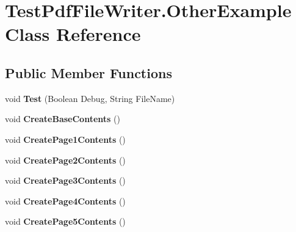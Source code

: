 \hypertarget{class_test_pdf_file_writer_1_1_other_example}{}\section{Test\+Pdf\+File\+Writer.\+Other\+Example Class Reference}
\label{class_test_pdf_file_writer_1_1_other_example}
\subsection*{Public Member Functions}
\begin{DoxyCompactItemize}
\item 
void {\bfseries Test} (Boolean Debug, String File\+Name)\hypertarget{class_test_pdf_file_writer_1_1_other_example_a05d9691e183d8d2abbf63fe55873abaf}{}\label{class_test_pdf_file_writer_1_1_other_example_a05d9691e183d8d2abbf63fe55873abaf}

\item 
void {\bfseries Create\+Base\+Contents} ()\hypertarget{class_test_pdf_file_writer_1_1_other_example_a222171120b6dc9bf6f203375d718e258}{}\label{class_test_pdf_file_writer_1_1_other_example_a222171120b6dc9bf6f203375d718e258}

\item 
void {\bfseries Create\+Page1\+Contents} ()\hypertarget{class_test_pdf_file_writer_1_1_other_example_affce4d5ab7154723a18a561719cad9bc}{}\label{class_test_pdf_file_writer_1_1_other_example_affce4d5ab7154723a18a561719cad9bc}

\item 
void {\bfseries Create\+Page2\+Contents} ()\hypertarget{class_test_pdf_file_writer_1_1_other_example_aba5ec85f75e69699fd78dbd4e90ec4ba}{}\label{class_test_pdf_file_writer_1_1_other_example_aba5ec85f75e69699fd78dbd4e90ec4ba}

\item 
void {\bfseries Create\+Page3\+Contents} ()\hypertarget{class_test_pdf_file_writer_1_1_other_example_a59afb037cda75823a03fa8dbd4fc8d5e}{}\label{class_test_pdf_file_writer_1_1_other_example_a59afb037cda75823a03fa8dbd4fc8d5e}

\item 
void {\bfseries Create\+Page4\+Contents} ()\hypertarget{class_test_pdf_file_writer_1_1_other_example_ab43c91522816336b5f21d8b91fb1daf0}{}\label{class_test_pdf_file_writer_1_1_other_example_ab43c91522816336b5f21d8b91fb1daf0}

\item 
void {\bfseries Create\+Page5\+Contents} ()\hypertarget{class_test_pdf_file_writer_1_1_other_example_a3716b8d02be491c8bbfb39615fabf232}{}\label{class_test_pdf_file_writer_1_1_other_example_a3716b8d02be491c8bbfb39615fabf232}


\end{DoxyCompactItemize}
